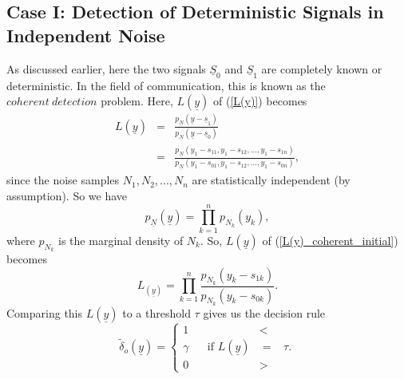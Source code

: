 \documentclass[a4paper,english,12pt]{article}
\begin{document}
\subsection{Case I: Detection of Deterministic Signals in Independent Noise}
As discussed earlier, here the two signals $\underline{S}_{0}$ and $\underline{S}_{1}$ are completely known or deterministic. In the field of communication, this is known as the $coherent\ detection$ problem. Here, $L(\underline{y})$ of (\ref{L(y)}) becomes
\begin{eqnarray}
\label{L(y)_coherent_initial}
L (\underline{y})&=&\frac{p_{\underline{N}}(\underline{y}-\underline{s}_{1})}{p_{\underline{N}}(\underline{y}-\underline{s}_{0})}\nonumber\\
&=&\frac{p_{\underline{N}}(y_{1}-s_{11},y_{1}-s_{12},...,y_{1}-s_{1n})} {p_{\underline{N}}(y_{1}-s_{01},y_{1}-s_{12},...,y_{1}-s_{0n})},
\end{eqnarray}
since the noise samples $N_{1},N_{2},...,N_{n}$ are statistically independent (by assumption). So we have
\begin{equation}
p_{\underline{N}}(\underline{y})= \prod_{k=1}^{n}   p_{N_{k}}(y_{k}),
\end{equation}
where $p_{N_{k}}$ is the marginal density of $N_{k}$. So, $L({\underline{y}})$ of (\ref{L(y)_coherent_initial}) becomes  
\begin{equation}
\label{L(y)_Coherent}
L_(\underline{y})= \prod_{k=1}^{n}\frac{p_{N_{k}}(y_{k}-s_{1k})}{p_{N_{k}}(y_{k}-s_{0k})}.
\end{equation}
Comparing this $L(\underline{y})$ to a threshold $\tau$ gives us the decision rule
\begin{equation}
\tilde\delta_{o}(\underline{y})=\begin{cases} 
1 &<\\
\gamma \hspace{20pt}\text{if } L(\underline{y}) &= \hspace{10pt}\tau.\\
0 &>
\end{cases}
\end{equation}
\end{document}
